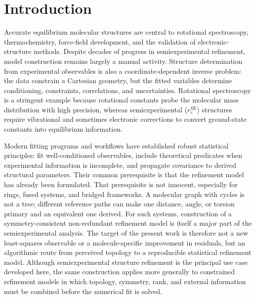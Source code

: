 \documentclass[aip,jcp,reprint,longbibliography,floatfix]{revtex4-2}
\begin{document}
\begin{abstract}
\end{abstract}


\maketitle


\section{Introduction}

Accurate equilibrium molecular structures are central to rotational
spectroscopy, thermochemistry, force-field development, and the validation of
electronic-structure methods.\cite{Demaison2011EquilibriumStructures,PuzzariniStanton2023}
Despite decades of progress in semiexperimental refinement, model construction
remains largely a manual activity. Structure determination from experimental
observables is also a
coordinate-dependent inverse problem: the data constrain a Cartesian geometry,
but the fitted variables determine conditioning, constraints, correlations, and
uncertainties. Rotational spectroscopy is a stringent example because
rotational constants probe the molecular mass distribution with high precision,
whereas semiexperimental ($r_e^{\mathrm{SE}}$) structures require vibrational
and sometimes electronic corrections to convert ground-state constants into
equilibrium information.\cite{Costain1958,Pawlowski2002,Piccardo2015B3LYP,Penocchio2015B2PLYP}

Modern fitting programs and workflows\cite{Mendolicchio2017MSR,KisielPROSPE,Kanzow2025PCCP}
have established robust statistical principles: fit well-conditioned
observables, include theoretical predicates when experimental information is
incomplete, and propagate covariance to derived structural
parameters.\cite{Bartell1975Predicate} Their common prerequisite is that the
refinement model has already been formulated. That prerequisite is not
innocent, especially for rings, fused systems, and bridged frameworks. A
molecular graph with cycles is not a tree; different reference paths can make
one distance, angle, or torsion primary and an equivalent one derived. For
such systems, construction of a symmetry-consistent non-redundant refinement
model is itself a major part of the semiexperimental analysis. The target of
the present work is therefore not a new least-squares observable or a
molecule-specific improvement in residuals, but an algorithmic route from
perceived topology to a reproducible statistical refinement model.
Although semiexperimental structure refinement is the principal use case
developed here, the same construction applies more generally to constrained
refinement models in which topology, symmetry, rank, and external information
must be combined before the numerical fit is solved.
\end{document}
